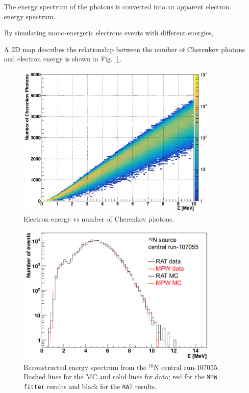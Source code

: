 The energy spectrum of the photons is converted into an apparent electron energy spectrum\cite{waterunidoc}.

By simulating mono-energetic electrons events with different energies,

A 2D map describes the relationship between the number of Cherenkov photons and electron energy is shown in Fig.~\ref{N16energyMap}.  

\begin{figure}[htbp]
	\centering
	\includegraphics[width=10cm]{2dmap_EvsNphoton.png}
	\caption{Electron energy vs number of Cherenkov photons.}
	\label{N16energyMap}
\end{figure}

\begin{figure}[htbp]
	\centering
	\includegraphics[width=10cm]{N16_reconE_107055.png}
	\caption{Reconstructed energy spectrum from the $^{16}$N central run-107055. Dashed lines for the MC and solid lines for data; red for the \texttt{MPW fitter} results and black for the \texttt{RAT} results.}
	\label{N16energy}
\end{figure}

